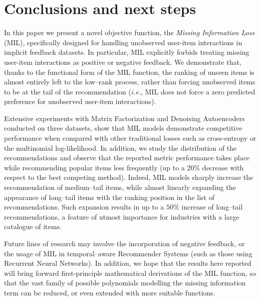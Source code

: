 \section{Conclusions and next steps}\label{sec:conclusions}
In this paper we present a novel objective function, the \emph{Missing Information Loss} (MIL), specifically designed for handling unobserved user-item interactions in implicit feedback datasets. In particular, MIL explicitly forbids treating missing user-item interactions as positive or negative feedback.
We demonstrate that, thanks to the functional form of the MIL function, the ranking of unseen items is almost entirely left to the low--rank process, rather than forcing unobserved items to be at the tail of the recommendation (\emph{i.e.}, MIL does not force a zero predicted preference for unobserved user-item interactions). 

Extensive experiments with Matrix Factorization and Denoising Autoencoders conducted on three datasets, show that \textsc{MIL} models demonstrate competitive performance when compared with other traditional losses such as cross-entropy or the multinomial log-likelihood. 
In addition, we study the distribution of the recommendations and observe that the reported metric performance takes place while recommending popular items less frequently (up to a $20 \%$ decrease with respect to the best competing method). Indeed, \textsc{MIL} models sharply increase the recommendation of medium--tail items, while almost linearly expanding the appearance of long--tail items with the ranking position in the list of recommendations. Such expansion results in up to a $50 \%$ increase of long--tail recommendations, a feature of utmost importance for industries with a large catalogue of items. 

Future lines of research may involve the incorporation of negative feedback, or the usage of \textsc{MIL} in temporal--aware Recommender Systems (such as those using Recurrent Neural Networks).  
In addition, we hope that the results here reported  will bring forward first-principle mathematical derivations of the \textsc{MIL} function, so that the vast family of possible polynomials modelling the missing information term can be reduced, or even extended with more suitable functions. 